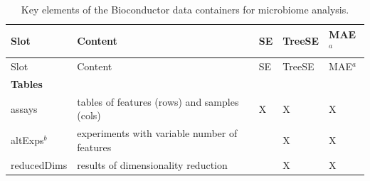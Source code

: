 \documentclass[
  sn-nature,
]{sn-jnl}
\begin{document}
\begin{longtable}[]{@{}
  >{\raggedright\arraybackslash}p{}
  >{\raggedright\arraybackslash}p{}
  >{\centering\arraybackslash}p{}
  >{\centering\arraybackslash}p{}
  >{\centering\arraybackslash}p{}@{}}
\caption{Key elements of the Bioconductor data containers for microbiome
analysis. }\label{tbl-elements}\tabularnewline
\toprule\noalign{}
\begin{minipage}[b]{\linewidth}\raggedright
Slot
\end{minipage} & \begin{minipage}[b]{\linewidth}\raggedright
Content
\end{minipage} & \begin{minipage}[b]{\linewidth}\centering
SE
\end{minipage} & \begin{minipage}[b]{\linewidth}\centering
TreeSE
\end{minipage} & \begin{minipage}[b]{\linewidth}\centering
MAE\(^a\)
\end{minipage} \\
\midrule\noalign{}
\endfirsthead
\toprule\noalign{}
\begin{minipage}[b]{\linewidth}\raggedright
Slot
\end{minipage} & \begin{minipage}[b]{\linewidth}\raggedright
Content
\end{minipage} & \begin{minipage}[b]{\linewidth}\centering
SE
\end{minipage} & \begin{minipage}[b]{\linewidth}\centering
TreeSE
\end{minipage} & \begin{minipage}[b]{\linewidth}\centering
MAE\(^a\)
\end{minipage} \\
\midrule\noalign{}
\endhead
\bottomrule\noalign{}
\endlastfoot
\textbf{Tables} & & & & \\
assays & tables of features (rows) and samples (cols) & X & X & X \\
altExps\(^b\) & experiments with variable number of features & & X &
X \\
reducedDims & results of dimensionality reduction & & X & X \\

\end{longtable}
\end{document}
